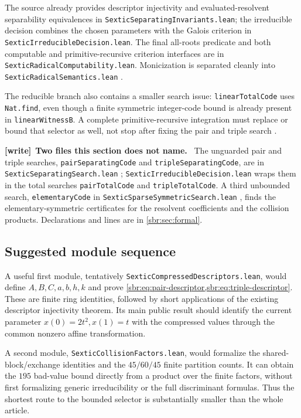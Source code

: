 \documentclass[11pt,letterpaper]{article}
\numberwithin{equation}{section}
\theoremstyle{definition}
\theoremstyle{remark}
\newcommand{\src}[1]{\texttt{\nolinkurl{#1}}}
\newenvironment{writenote}[1][]{\par\smallskip\begingroup\small
 \noindent\textbf{[write]}\if\relax\detokenize{#1}\relax\else~\textbf{#1.}\fi\ }%
 {\par\endgroup\smallskip}
\begin{document}
The source already provides descriptor injectivity and evaluated-resolvent
separability equivalences in \src{SexticSeparatingInvariants.lean}; the
irreducible decision combines the chosen parameters with the Galois
criterion in \src{SexticIrreducibleDecision.lean}. The final all-roots
predicate and both computable and primitive-recursive criterion interfaces
are in \src{SexticRadicalComputability.lean}. Monicization is separated
cleanly into \src{SexticRadicalSemantics.lean}
\cite{repo-invariants,repo-search,repo-computability,repo-semantics}.

The reducible branch also contains a smaller search issue:
\src{linearTotalCode} uses \src{Nat.find}, even though a finite symmetric
integer-code bound is already present in \src{linearWitnessB}. A complete
primitive-recursive integration must replace or bound that selector as
well, not stop after fixing the pair and triple search
\cite{repo-reducible}.

\begin{writenote}[Two files this section does not name]
The unguarded pair and triple searches, \src{pairSeparatingCode} and
\src{tripleSeparatingCode}, are in \src{SexticSeparatingSearch.lean}
\cite{repo-separating-search}; \src{SexticIrreducibleDecision.lean} wraps
them in the total searches \src{pairTotalCode} and \src{tripleTotalCode}.
A third unbounded search, \src{elementaryCode} in
\src{SexticSparseSymmetricSearch.lean} \cite{repo-sparse-search}, finds the
elementary-symmetric certificates for the resolvent coefficients and the
collision products. Declarations and lines are in \cref{sbr:sec:formal}.
\end{writenote}

\subsection{Suggested module sequence}

A useful first module, tentatively
\src{SexticCompressedDescriptors.lean}, would define $A,B,C,a,b,h,k$ and
prove \cref{sbr:eq:pair-descriptor,sbr:eq:triple-descriptor}. These are finite ring
identities, followed by short applications of the existing descriptor
injectivity theorem. Its main public result should identify the current
parameter $x(0)=2t^2,x(1)=t$ with the compressed values through the common
nonzero affine transformation.

A second module, \src{SexticCollisionFactors.lean}, would formalize the
shared-block/exchange identities and the $45/60/45$ finite partition
counts. It can obtain the $195$ bad-value bound directly from a product
over the finite factors, without first formalizing generic irreducibility
or the full discriminant formulas. Thus the shortest route to the bounded
selector is substantially smaller than the whole article.
\end{document}
